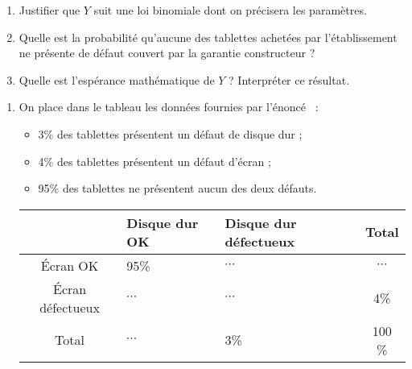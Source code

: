 \par
\begin{enumerate}
     \par
     \item %
     Justifier que $Y$ suit une loi binomiale dont on précisera les paramètres.
     \par
     \item %
     Quelle est la probabilité qu'aucune des tablettes achetées par l'établissement ne présente de défaut couvert par la garantie constructeur ?
     \par
     \item %
     Quelle est l'espérance mathématique de $Y$ ? Interpréter ce résultat.
     \par
\end{enumerate}
\begin{corrige}
     \par
     \begin{enumerate}
          \par
          \item %
          \par
          On place dans le tableau les données fournies par l'énoncé ~:
          \par
          \begin{itemize}
               \item %
               3\% des tablettes présentent un défaut de disque dur ;
               \item %
               4\% des tablettes présentent un défaut d'écran ;
               \item %
               95\% des tablettes ne présentent aucun des deux défauts.
          \end{itemize}
          \begin{center}
               \begin{tabular}{|c|p{2cm}|p{2cm}|c|}%
                    \hline
                    $\ $ & Disque dur OK & Disque dur défectueux & Total \\
                    \hline
                    \'Ecran OK &  95\% & $\cdots$ & $\cdots$ \\
                    \hline
                    \'Ecran défectueux & $\cdots$ & $\cdots$ & 4\% \\
                    \hline
                    Total & $\cdots$ & 3\% & 100 \% \\
                    \hline
               \end{tabular}

\end{center}
\end{enumerate}
\end{corrige}
